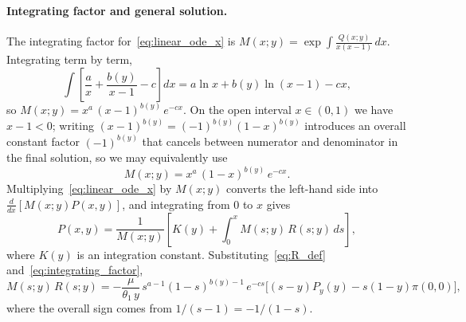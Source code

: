 \paragraph{Integrating factor and general solution.}
The integrating factor for~\eqref{eq:linear_ode_x} is $M(x;y) = \exp\!\int \frac{Q(x;y)}{x(x-1)}\,dx$. Integrating term by term,
\begin{equation}
    \int\!\left[\frac{a}{x} + \frac{b(y)}{x-1} - c\right] dx = a \ln x + b(y) \ln(x-1) - cx,
\end{equation}
so $M(x;y) = x^{a}\, (x-1)^{b(y)}\, e^{-cx}$. On the open interval $x \in (0,1)$ we have $x - 1 < 0$; writing $(x-1)^{b(y)} = (-1)^{b(y)} (1-x)^{b(y)}$ introduces an overall constant factor $(-1)^{b(y)}$ that cancels between numerator and denominator in the final solution, so we may equivalently use
\begin{equation}
    M(x;y) = x^{a}\, (1-x)^{b(y)}\, e^{-cx}.
    \label{eq:integrating_factor}
\end{equation}
Multiplying~\eqref{eq:linear_ode_x} by $M(x;y)$ converts the left-hand side into $\frac{d}{dx}\!\left[M(x;y) P(x,y)\right]$, and integrating from $0$ to $x$ gives
\begin{equation}
    P(x,y) = \frac{1}{M(x;y)}\left[ K(y) + \int_0^x M(s;y)\, R(s;y)\, ds \right],
    \label{eq:general_solution}
\end{equation}
where $K(y)$ is an integration constant. Substituting~\eqref{eq:R_def} and~\eqref{eq:integrating_factor},
\begin{equation}
    M(s;y)\, R(s;y) = -\frac{\mu}{\theta_1\, y}\, s^{a-1}(1-s)^{b(y)-1}\, e^{-cs}\Big[(s-y) P_y(y) - s(1-y)\pi(0,0)\Big],
    \label{eq:MR_product}
\end{equation}
where the overall sign comes from $1/(s-1) = -1/(1-s)$.


